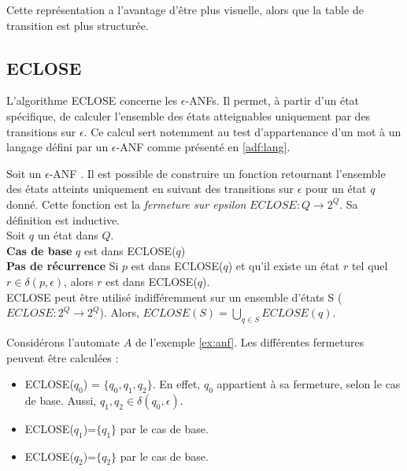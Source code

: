 Cette représentation a l'avantage d'être plus visuelle, alors que la table de transition est plus structurée.


\subsection{ECLOSE}\label{adf:eclose}

L'algorithme ECLOSE concerne les $\epsilon$-ANFs. Il permet, à partir d'un état spécifique, de calculer l'ensemble des états atteignables uniquement par des transitions sur $\epsilon$. Ce calcul sert notemment au test d'appartenance d'un mot à un langage défini par un $\epsilon$-ANF comme présenté en \ref{adf:lang}.

Soit un $\epsilon$-ANF \automaton. Il est possible de construire un fonction retournant l'ensemble des états atteints uniquement en suivant des transitions sur $\epsilon$ pour un état $q$ donné. Cette fonction est la \emph{fermeture sur epsilon} $ECLOSE : Q \rightarrow 2^Q$. Sa définition est inductive.\\

Soit $q$ un état dans $Q$.\\
\textbf{Cas de base} $q$ est dans ECLOSE($q$)\\
\textbf{Pas de récurrence} Si $p$ est dans ECLOSE($q$) et qu'il existe un état $r$ tel quel $r\in\delta(p,\epsilon)$, alors $r$ est dans ECLOSE($q$).\\

ECLOSE peut être utilisé indifféremment sur un ensemble d'états S ($ECLOSE : 2^Q \rightarrow 2^Q$). Alors, $ECLOSE(S)=\bigcup_{q\in S}ECLOSE(q)$.

\begin{example}[ECLOSE]\label{ex:anfclosure} Considérons l'automate $A$ de l'exemple \ref{ex:anf}. Les différentes fermetures peuvent être calculées :
	\begin{itemize}
		\item ECLOSE($q_0$) = $\{q_0,q_1,q_2\}$. En effet, $q_0$ appartient à sa fermeture, selon le cas de base. Aussi, $q_1,q_2\in\delta(q_0, \epsilon)$.
		\item ECLOSE($q_1$)=$\{q_1\}$ par le cas de base.
		\item ECLOSE($q_2$)=$\{q_2\}$ par le cas de base.
	\end{itemize}
\end{example}




